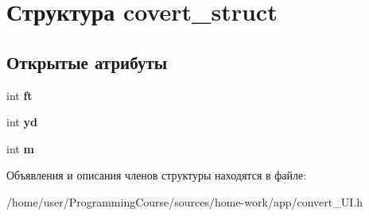 \hypertarget{structcovert__struct}{\section{Структура covert\+\_\+struct}
\label{structcovert__struct}
}
\subsection*{Открытые атрибуты}
\begin{DoxyCompactItemize}
\item 
\hypertarget{structcovert__struct_accae3ddc65059c329fa264fe63f8214a}{int {\bfseries ft}}\label{structcovert__struct_accae3ddc65059c329fa264fe63f8214a}

\item 
\hypertarget{structcovert__struct_ad101f99379902be709fd1cb9397f39c9}{int {\bfseries yd}}\label{structcovert__struct_ad101f99379902be709fd1cb9397f39c9}

\item 
\hypertarget{structcovert__struct_ac432f0ac70e23b07a9338fbfc2427680}{int {\bfseries m}}\label{structcovert__struct_ac432f0ac70e23b07a9338fbfc2427680}

\end{DoxyCompactItemize}


Объявления и описания членов структуры находятся в файле\+:\begin{DoxyCompactItemize}
\item 
/home/user/\+Programming\+Course/sources/home-\/work/app/convert\+\_\+\+U\+I.\+h\end{DoxyCompactItemize}
